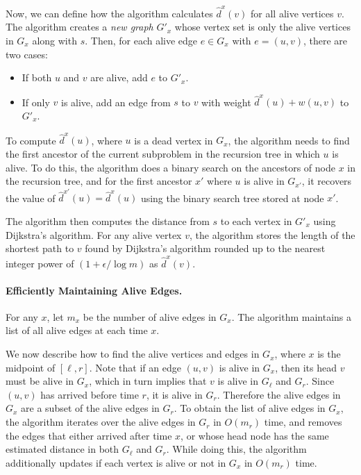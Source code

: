 \documentclass[11pt]{article}
\begin{document}
Now, we can define how the algorithm calculates $\hat{d}^x(v)$ for all alive vertices $v$. 
The algorithm creates a \emph{new graph} $G'_x$ whose vertex set is only the alive vertices in $G_x$ along with $s$. Then, for each alive edge $e\in G_x$ with $e = (u,v)$, there are two cases:
\begin{itemize}
    \item If both $u$ and $v$ are alive,  add $e$ to $G'_x$.
    \item If only $v$ is alive, add an edge from $s$ to $v$ with weight $\hat{d}^x(u) + w(u,v)$ to $G'_x$.
\end{itemize}
To compute $\hat{d}^x(u)$, where $u$ is a dead vertex in $G_x$, the algorithm needs to find the first ancestor of the current subproblem in the recursion tree in which $u$ is alive.
To do this, the algorithm does a binary search on the ancestors of node $x$ in the recursion tree, and for the first ancestor $x'$ where $u$ is alive in $G_{x'}$, it recovers the value of $\hat{d}^{x'}(u)=\hat{d}^x(u)$ using the binary search tree stored at node $x'$. 

The algorithm then computes the distance from $s$ to each vertex in $G'_x$ using Dijkstra's algorithm.  For any alive vertex $v$, the algorithm stores the length of the shortest path to $v$ found by Dijkstra's algorithm rounded up to the nearest integer power of $(1+\epsilon/\log m)$ as $\hat{d}^x(v)$.  

\paragraph{Efficiently Maintaining Alive Edges.}
For any $x$, let $m_x$ be the number of alive edges in $G_x$.   The algorithm maintains
a list of all alive edges at each time $x$.  

We now describe how to find the alive vertices and edges in $G_x$, where $x$ is the midpoint of $[\ell, r]$.
Note that if an edge $(u,v)$ is alive in $G_x$, then its head $v$ must be alive in $G_x$, which in turn implies that $v$ is alive in $G_\ell$ and $G_r$. Since $(u,v)$ has arrived before time $r$, it is alive in $G_r$.
Therefore the alive edges in $G_x$ are a subset of the alive edges in $G_r$.
To obtain the list of alive edges in $G_x$, the algorithm iterates over the alive edges in $G_r$ in $O(m_r)$ time, and removes the edges that either arrived after time $x$, or whose head node has the same estimated distance in both $G_\ell$ and $G_r$.   
While doing this, the algorithm additionally updates if each vertex is alive or not in $G_x$ in $O(m_r)$ time.
\end{document}

